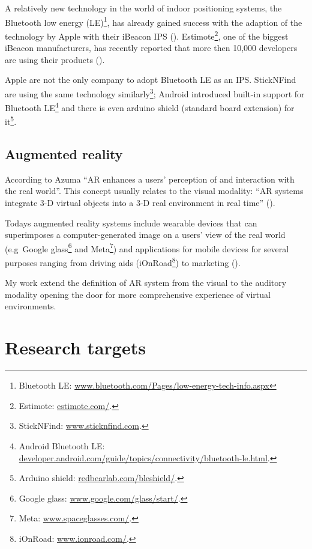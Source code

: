 \documentclass[a4paper,11pt]{article}
\begin{document}
A relatively new technology in the world of indoor positioning systems, the Bluetooth low energy (LE)\footnote{Bluetooth LE: \href{http://www.bluetooth.com/Pages/low-energy-tech-info.aspx}{www.bluetooth.com/Pages/low-energy-tech-info.aspx}}, has already gained success with the adaption of the technology by Apple with their iBeacon IPS (\cite{web:danova}).
Estimote\footnote{Estimote: \href{http://estimote.com/}{estimote.com/}.}, one of the biggest iBeacon manufacturers, has recently reported that more then 10,000 developers are using their products (\cite{web:thompson}).

Apple are not the only company to adopt Bluetooth LE as an IPS. StickNFind are using the same technology similarly\footnote{StickNFind: \href{https://www.sticknfind.com}{www.sticknfind.com}.}; Android introduced built-in support for Bluetooth LE\footnote{Android Bluetooth LE: \href{http://developer.android.com/guide/topics/connectivity/bluetooth-le.html}{developer.android.com/guide/topics/connectivity/bluetooth-le.html}.} and there is even arduino shield (standard board extension) for it\footnote{Arduino shield: \href{http://redbearlab.com/bleshield/}{redbearlab.com/bleshield/}.}.

\subsection{Augmented reality}

According to Azuma ``AR enhances a users' perception of and interaction with the real world''.
This concept usually relates to the visual modality: ``AR systems integrate 3-D virtual objects into a 3-D real environment in real time'' (\cite{azuma97}).

Todays augmented reality systems include wearable devices that can superimposes a computer-generated image on a users' view of the real world (e.g\ Google glass\footnote{Google glass: \href{http://www.google.com/glass/start/}{www.google.com/glass/start/}.} and Meta\footnote{Meta: \href{https://www.spaceglasses.com/}{www.spaceglasses.com/}.}) and applications for mobile devices for several purposes ranging from driving aids (iOnRoad\footnote{iOnRoad: \href{http://www.ionroad.com/}{www.ionroad.com/}.}) to marketing (\cite{ikea}).

My work extend the definition of AR system from the visual to the auditory modality opening the door for more comprehensive experience of virtual environments.

\section{Research targets}
\end{document}
